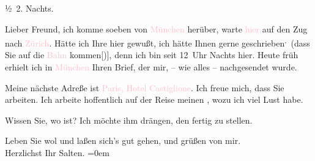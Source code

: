\pstart
           \raggedleft{}½ 2. Nachts.
               \pend
           
\pstart
           Lieber Freund, ich komme soeben von \textcolor{pink}{München}{}\ledrightnote{\textcolor{pink}{München}} herüber, warte \textcolor{pink}{hier}{}\ledrightnote{{$\rightarrow$}\textcolor{pink}{Hauptbahnhof Salzburg}} auf den Zug nach \textcolor{pink}{Zürich}{}\ledrightnote{\textcolor{pink}{Zürich}}. Hätte ich
               Ihre \label{K_L03314-2v}\label{K_L03314-2h} hier gewußt, ich hätte Ihnen
               gerne geschrieben\substVorne{}\textsuperscript{,}\substDazwischen{} (\substHinten{}dass Sie auf die \textcolor{pink}{Bahn}{}\ledrightnote{{$\rightarrow$}\textcolor{pink}{Hauptbahnhof Salzburg}}
                  kommen{[}){]}, denn ich bin seit 12 Uhr Nachts hier.
                  Heute{ }früh erhielt ich in \textcolor{pink}{München}{}\ledrightnote{\textcolor{pink}{München}} Ihren
               Brief, der mir, – wie alles – nachgesendet wurde.\pend
           
\pstart
           Meine nächste Adreße ist \textcolor{pink}{Paris, Hotel
                  Castiglione}{}\ledrightnote{\textcolor{pink}{Hotel Castiglione}}. Ich freue mich, dass Sie arbeiten. Ich arbeite hoffentlich auf
               der Reise meinen \label{K_L03314-3v}\label{K_L03314-3h}, wozu ich viel Lust
               habe.\pend
           
\pstart
           Wissen Sie, wo \label{K_L03314-4v}\label{K_L03314-4h} ist? Ich möchte ihm drängen, den \label{K_L03314-5v}\label{K_L03314-5h} fertig zu stellen.\pend
           
\pstart
           Leben Sie wol und laßen sich’s gut gehen, und grüßen von mir. {\\[\baselineskip]}Herzlichst
               Ihr \spacefill\mbox{Salten.}\pend
           \leftskip=0em{}\endnumbering{}  
      